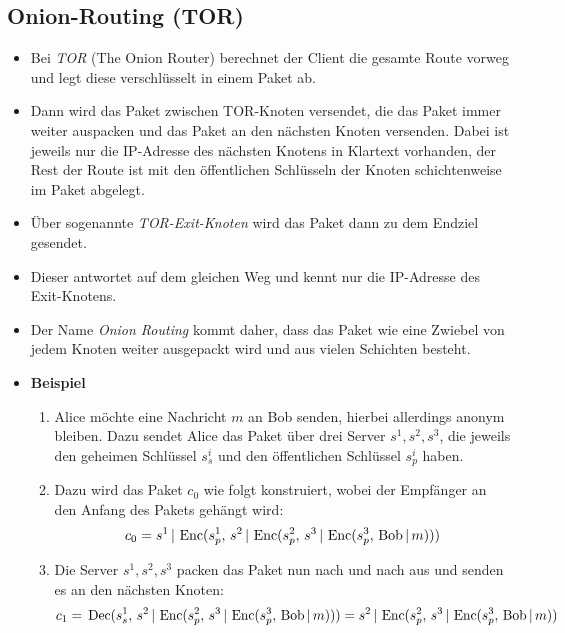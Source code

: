         \subsection{Onion-Routing (TOR)}
            \begin{itemize}
            	\item Bei \textit{TOR} (The Onion Router) berechnet der Client die gesamte Route vorweg und legt diese verschlüsselt in einem Paket ab.
            	\item Dann wird das Paket zwischen TOR-Knoten versendet, die das Paket immer weiter auspacken und das Paket an den nächsten Knoten versenden. Dabei ist jeweils nur die IP-Adresse des nächsten Knotens in Klartext vorhanden, der Rest der Route ist mit den öffentlichen Schlüsseln der Knoten schichtenweise im Paket abgelegt.
            	\item Über sogenannte \textit{TOR-Exit-Knoten} wird das Paket dann zu dem Endziel gesendet.
            	\item Dieser antwortet auf dem gleichen Weg und kennt nur die IP-Adresse des Exit-Knotens.
            	\item Der Name \textit{Onion Routing} kommt daher, dass das Paket wie eine Zwiebel von jedem Knoten weiter ausgepackt wird und aus vielen Schichten besteht.
            	\item \textbf{Beispiel}
                	\begin{enumerate}
                		\item Alice möchte eine Nachricht \(m\) an Bob senden, hierbei allerdings anonym bleiben. Dazu sendet Alice das Paket über drei Server \( s^1, s^2, s^3 \), die jeweils den geheimen Schlüssel \( s^i_s \) und den öffentlichen Schlüssel \( s^i_p \) haben.
                		\item Dazu wird das Paket \( c_0 \) wie folgt konstruiert, wobei der Empfänger an den Anfang des Pakets gehängt wird:
	                		\begin{equation*}
		                		c_0 = s^1 \,\vert\, \operatorname{Enc}(s^1_p,\, s^2 \,\vert\, \operatorname{Enc}(s^2_p,\, s^3 \,\vert\, \operatorname{Enc}(s^3_p,\, \text{Bob} \,\vert\, m)))
	                		\end{equation*}
	                	\item Die Server \( s^1, s^2, s^3 \) packen das Paket nun nach und nach aus und senden es an den nächsten Knoten:
		                	\begin{align*}
			                	c_1 &=\, \Dec(s^1_s,\, s^2 \,\vert\, \Enc(s^2_p,\, s^3 \,\vert\, \Enc(s^3_p,\, \text{Bob} \,\vert\, m))) = s^2 \,\vert\, \Enc(s^2_p,\, s^3 \,\vert\, \Enc(s^3_p,\, \text{Bob} \,\vert\, m)) \\

\end{align*}
\end{enumerate}
\end{itemize}
